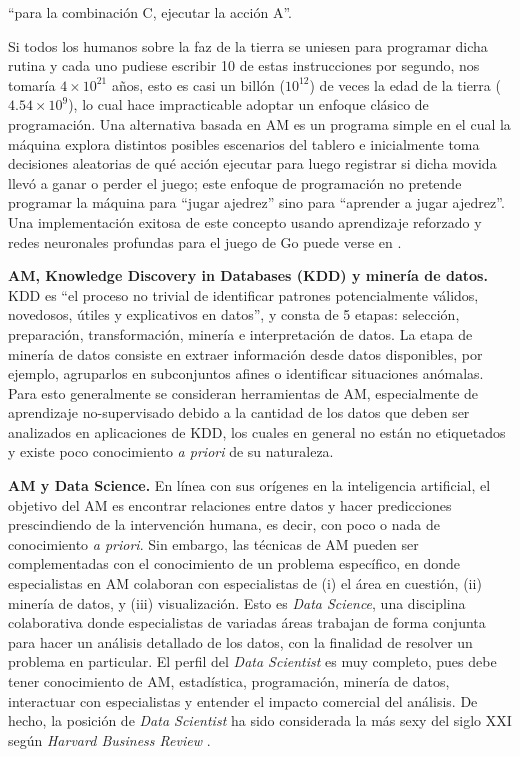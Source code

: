 \vspace{1em}
\centerline{“para la combinación C, ejecutar la acción A”.}
\vspace{1em}
\noindent Si todos los humanos sobre la faz de la tierra se uniesen para programar dicha rutina y cada uno pudiese escribir 10 de estas instrucciones por segundo, nos tomaría $4\times10^{21}$ años, esto es casi un billón ($10^{12}$) de veces la edad de la tierra ($4.54\times10^9$), lo cual hace impracticable adoptar un enfoque clásico de programación. Una alternativa basada en AM es un programa simple en el cual la máquina explora distintos posibles escenarios del tablero e inicialmente toma decisiones aleatorias de qué acción ejecutar para luego registrar si dicha movida llevó a ganar o perder el juego; este enfoque de programación no pretende programar la máquina para “jugar ajedrez” sino para “aprender a jugar ajedrez”. Una implementación exitosa de este concepto usando aprendizaje reforzado y redes neuronales profundas para el juego de Go puede verse en \cite{silver_2016}.


\textbf{AM, Knowledge Discovery in Databases (KDD) y minería de datos.} KDD \cite{fayyad_1996} es “el 
proceso no trivial de identificar patrones 
potencialmente válidos, novedosos, útiles y 
explicativos en datos”, y consta 
de 5 etapas: selección, preparación, transformación, minería e interpretación 
de datos. La etapa de minería de datos  consiste en extraer información desde 
datos disponibles, por ejemplo, agruparlos en subconjuntos afines o identificar situaciones 
anómalas. Para esto generalmente se consideran herramientas de AM, especialmente de aprendizaje no-supervisado debido a la cantidad de los datos 
que deben ser analizados en aplicaciones de KDD, 
los cuales en general no están
no etiquetados y existe poco conocimiento 
\emph{a priori} de su naturaleza. 

\textbf{AM y Data Science.} En línea con sus orígenes en la inteligencia artificial, el objetivo del AM es encontrar relaciones entre datos y hacer predicciones prescindiendo de la intervención humana, es decir, con poco o nada de conocimiento \emph{a priori}. Sin embargo, las técnicas de AM pueden ser complementadas con el conocimiento de un problema específico, en donde especialistas en AM colaboran con especialistas de (i) el área en cuestión, (ii) minería de datos, y (iii) visualización. Esto es \emph{Data Science}, una disciplina colaborativa donde especialistas de variadas áreas trabajan de forma conjunta para hacer un análisis detallado de los datos, con la finalidad de resolver un problema en particular. El perfil del \emph{Data Scientist} es muy completo, pues debe tener conocimiento de AM, estadística, programación, minería de datos, interactuar con especialistas y entender el impacto comercial del análisis. De hecho, la posición de \emph{Data Scientist} ha sido considerada la más sexy del siglo XXI según \emph{Harvard Business Review} \cite{harvard_DS}.



